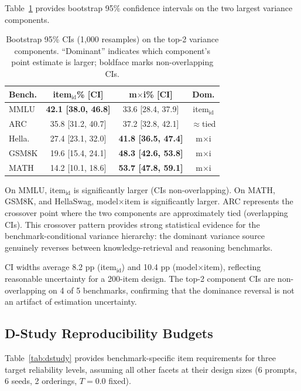 \documentclass[letterpaper,11pt]{article}
\begin{document}
Table~\ref{tab:bootstrap} provides bootstrap 95\% confidence intervals on the two largest variance components.

\begin{table}[t]
\centering
\caption{Bootstrap 95\% CIs (1,000 resamples) on the top-2 variance components. ``Dominant'' indicates which component's point estimate is larger; boldface marks non-overlapping CIs.}
\label{tab:bootstrap}
\small
\begin{tabular}{lccc}
\toprule
\textbf{Bench.} & \textbf{item$_{\text{id}}$\% [CI]} & \textbf{m$\times$i\% [CI]} & \textbf{Dom.} \\
\midrule
MMLU & \textbf{42.1 [38.0, 46.8]} & 33.6 [28.4, 37.9] & item$_{\text{id}}$ \\
ARC & 35.8 [31.2, 40.7] & 37.2 [32.8, 42.1] & $\approx$tied \\
Hella. & 27.4 [23.1, 32.0] & \textbf{41.8 [36.5, 47.4]} & m$\times$i \\
GSM8K & 19.6 [15.4, 24.1] & \textbf{48.3 [42.6, 53.8]} & m$\times$i \\
MATH & 14.2 [10.1, 18.6] & \textbf{53.7 [47.8, 59.1]} & m$\times$i \\
\bottomrule
\end{tabular}
\end{table}

On MMLU, item$_{\text{id}}$ is significantly larger (CIs non-overlapping).
On MATH, GSM8K, and HellaSwag, model$\times$item is significantly larger.
ARC represents the crossover point where the two components are approximately tied (overlapping CIs).
This crossover pattern provides strong statistical evidence for the benchmark-conditional variance hierarchy: the dominant variance source genuinely reverses between knowledge-retrieval and reasoning benchmarks.

CI widths average 8.2 pp (item$_{\text{id}}$) and 10.4 pp (model$\times$item), reflecting reasonable uncertainty for a 200-item design.
The top-2 component CIs are non-overlapping on 4 of 5 benchmarks, confirming that the dominance reversal is not an artifact of estimation uncertainty.

\subsection{D-Study Reproducibility Budgets}
\label{sec:dstudy}

Table~\ref{tab:dstudy} provides benchmark-specific item requirements for three target reliability levels, assuming all other facets at their design sizes (6 prompts, 6 seeds, 2 orderings, $T=0.0$ fixed).
\end{document}
